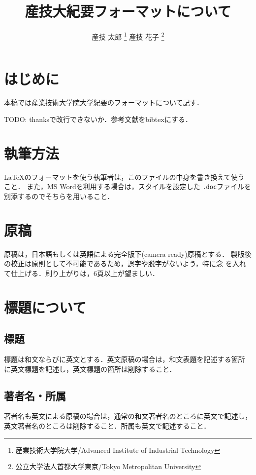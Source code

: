 \documentclass[a4j, 12Q, twocolumn, twoside]{jsarticle}
\title{産技大紀要フォーマットについて}
\author{
  産技 太郎
  \thanks{産業技術大学院大学/Advanced Institute of Industrial
  Technology}
  産技 花子
  \thanks{公立大学法人首都大学東京/Tokyo Metropolitan University}
}
\begin{document}
\maketitle[5pt]

\section{はじめに}
本稿では産業技術大学院大学紀要のフォーマットについて記す．

TODO: thanksで改行できないか．参考文献をbibtexにする．

\section{執筆方法}
\LaTeX のフォーマットを使う執筆者は，このファイルの中身を書き換えて使う
こと．
%
また，MS Wordを利用する場合は，スタイルを設定した
\texttt{.doc}ファイルを別添するのでそちらを用いること．

\section{原稿}
原稿は，日本語もしくは英語による完全版下(camera ready)原稿とする．
製版後の校正は原則として不可能であるため，誤字や脱字がないよう，特に念
を入れて仕上げる．刷り上がりは，6頁以上が望ましい．

\section{標題について}
\subsection{標題}
標題は和文ならびに英文とする．英文原稿の場合は，和文表題を記述する箇所
に英文標題を記述し，英文標題の箇所は削除すること．

\subsection{著者名・所属}
著者名も英文による原稿の場合は，通常の和文著者名のところに英文で記述し，
英文著者名のところは削除すること．所属も英文で記述すること．
\end{document}
